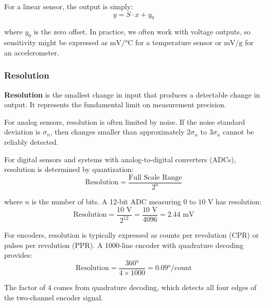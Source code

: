 For a linear sensor, the output is simply:
\begin{equation}
y = S \cdot x + y_0
\label{eq:linear_sensor}
\end{equation}

where $y_0$ is the zero offset. In practice, we often work with voltage outputs, so sensitivity might be expressed as $\text{mV}/°\text{C}$ for a temperature sensor or $\text{mV}/\text{g}$ for an accelerometer.


\subsubsection{Resolution}

\textbf{Resolution} is the smallest change in input that produces a detectable change in output. It represents the fundamental limit on measurement precision.

For analog sensors, resolution is often limited by noise. If the noise standard deviation is $\sigma_n$, then changes smaller than approximately $2\sigma_n$ to $3\sigma_n$ cannot be reliably detected.

For digital sensors and systems with analog-to-digital converters (ADCs), resolution is determined by quantization:
\begin{equation}
\text{Resolution} = \frac{\text{Full Scale Range}}{2^n}
\label{eq:adc_resolution}
\end{equation}

where $n$ is the number of bits. A 12-bit ADC measuring $0$ to $10\text{ V}$ has resolution:
\begin{equation}
\text{Resolution} = \frac{10\text{ V}}{2^{12}} = \frac{10\text{ V}}{4096} = 2.44\text{ mV}
\end{equation}

For encoders, resolution is typically expressed as counts per revolution (CPR) or pulses per revolution (PPR). A 1000-line encoder with quadrature decoding provides:
\begin{equation}
\text{Resolution} = \frac{360°}{4 \times 1000} = 0.09°/\text{count}
\end{equation}

The factor of 4 comes from quadrature decoding, which detects all four edges of the two-channel encoder signal.

